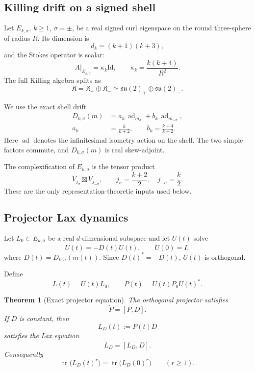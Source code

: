 \documentclass[
 aps,
 prd,
 reprint,
 amsmath,
 amssymb,
 nofootinbib,
 superscriptaddress
]{revtex4-2}
\newtheorem{theorem}{Theorem}[section]
\theoremstyle{definition}
\theoremstyle{remark}
\newcommand{\cK}{\mathfrak K}
\newcommand{\Id}{\mathrm{Id}}
\newcommand{\tr}{\operatorname{tr}}
\newcommand{\ad}{\operatorname{ad}}
\begin{document}
\subsection{Killing drift on a signed shell}

Let \(E_{k,\sigma}\), \(k\ge1\), \(\sigma=\pm\), be a real signed curl
eigenspace on the round three-sphere of radius \(R\).  Its dimension is
\[
 d_k=(k+1)(k+3),
\]
and the Stokes operator is scalar:
\[
 A|_{E_{k,\sigma}}=\kappa_k\Id,
 \qquad
 \kappa_k=\frac{k(k+4)}{R^2}.
\]
The full Killing algebra splits as
\[
 \cK=\cK_+\oplus\cK_-
 \simeq\mathfrak{su}(2)_+\oplus\mathfrak{su}(2)_-.
\]

We use the exact shell drift
\begin{equation}
\begin{aligned}
 D_{k,\sigma}(m)
 &=
 a_k\,\ad_{m_\sigma}
 +
 b_k\,\ad_{m_{-\sigma}},\\
 a_k&=\frac{k}{k+2},
 \qquad
 b_k=\frac{k+4}{k+2}.
\end{aligned}
\label{G:pr:eq:D}
\end{equation}
Here \(\ad\) denotes the infinitesimal isometry action on the shell.
The two simple factors commute, and \(D_{k,\sigma}(m)\) is real
skew-adjoint.

The complexification of \(E_{k,\sigma}\) is the tensor product
\[
 V_{j_\sigma}\boxtimes V_{j_{-\sigma}},
 \qquad
 j_\sigma=\frac{k+2}{2},
 \quad
 j_{-\sigma}=\frac{k}{2}.
\]
These are the only representation-theoretic inputs used below.

\subsection{Projector Lax dynamics}

Let \(L_0\subset E_{k,\sigma}\) be a real \(d\)-dimensional subspace and let
\(U(t)\) solve
\[
 \dot U(t)=-D(t)U(t),
 \qquad U(0)=I,
\]
where \(D(t)=D_{k,\sigma}(m(t))\).  Since \(D(t)^*=-D(t)\), \(U(t)\) is
orthogonal.

Define
\[
 L(t)=U(t)L_0,
 \qquad
 P(t)=U(t)P_0U(t)^*.
\]

\begin{theorem}[Exact projector equation]
\label{G:pr:thm:lax}
The orthogonal projector satisfies
\begin{equation}
 \boxed{\dot P=[P,D].}
 \label{G:pr:eq:lax}
\end{equation}
If \(D\) is constant, then
\begin{equation}
 L_D(t):=P(t)D
\end{equation}
satisfies the Lax equation
\begin{equation}
 \boxed{\dot L_D=[L_D,D].}
 \label{G:pr:eq:LD}
\end{equation}
Consequently
\begin{equation}
 \tr\bigl(L_D(t)^r\bigr)
 =
 \tr\bigl(L_D(0)^r\bigr)
 \qquad(r\ge1).
 \label{G:pr:eq:invariants}
\end{equation}
\end{theorem}
\end{document}

